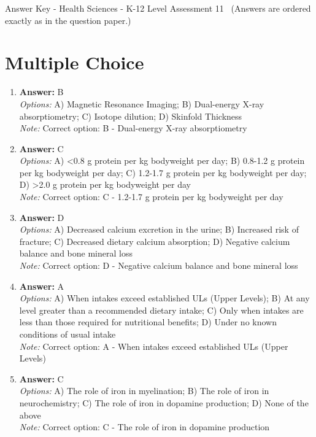 \documentclass[12pt]{article}
\begin{document}
\begin{center}
Answer Key - Health Sciences - K-12 Level Assessment 11 \
\small (Answers are ordered exactly as in the question paper.)
\end{center}

\section*{Multiple Choice}
\begin{enumerate}[label=\arabic*.]
\item \textbf{Answer:} B
\\ \textit{Options:} A) Magnetic Resonance Imaging; B) Dual-energy X-ray absorptiometry; C) Isotope dilution; D) Skinfold Thickness
\\ \textit{Note:} Correct option: B - Dual-energy X-ray absorptiometry
\item \textbf{Answer:} C
\\ \textit{Options:} A) \textless{}0.8 g protein per kg bodyweight per day; B) 0.8-1.2 g protein per kg bodyweight per day; C) 1.2-1.7 g protein per kg bodyweight per day; D) \textgreater{}2.0 g protein per kg bodyweight per day
\\ \textit{Note:} Correct option: C - 1.2-1.7 g protein per kg bodyweight per day
\item \textbf{Answer:} D
\\ \textit{Options:} A) Decreased calcium excretion in the urine; B) Increased risk of fracture; C) Decreased dietary calcium absorption; D) Negative calcium balance and bone mineral loss
\\ \textit{Note:} Correct option: D - Negative calcium balance and bone mineral loss
\item \textbf{Answer:} A
\\ \textit{Options:} A) When intakes exceed established ULs (Upper Levels); B) At any level greater than a recommended dietary intake; C) Only when intakes are less than those required for nutritional benefits; D) Under no known conditions of usual intake
\\ \textit{Note:} Correct option: A - When intakes exceed established ULs (Upper Levels)
\item \textbf{Answer:} C
\\ \textit{Options:} A) The role of iron in myelination; B) The role of iron in neurochemistry; C) The role of iron in dopamine production; D) None of the above
\\ \textit{Note:} Correct option: C - The role of iron in dopamine production
\end{enumerate}
\end{document}

